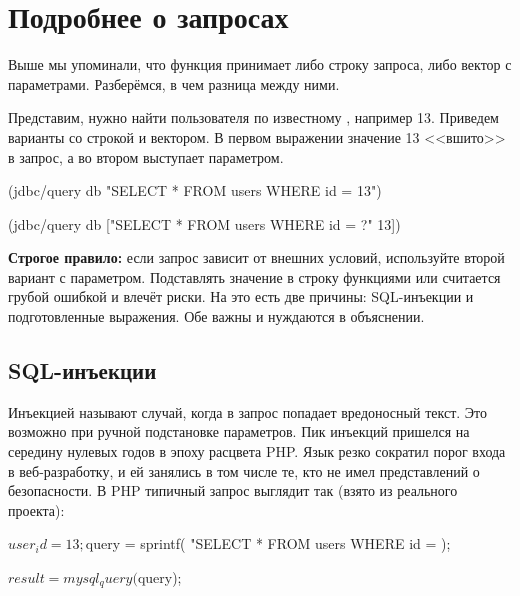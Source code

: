 \section{Подробнее о запросах}

Выше мы упоминали, что функция  принимает либо строку запроса, либо вектор с параметрами. Разберёмся, в чем разница между ними.


Представим, нужно найти пользователя по известному , например 13. Приведем варианты со строкой и вектором. В первом выражении значение 13 <<вшито>> в запрос, а во втором выступает параметром.

\begin{english}
  \begin{clojure}
(jdbc/query db
            "SELECT * FROM users WHERE id = 13")

(jdbc/query db
            ["SELECT * FROM users WHERE id = ?" 13])
  \end{clojure}
\end{english}

\textbf{Строгое правило:} если запрос зависит от внешних условий, используйте второй вариант с параметром. Подставлять значение в строку функциями  или  считается грубой ошибкой и влечёт риски. На это есть две причины: SQL-инъекции и подготовленные выражения. Обе важны и нуждаются в объяснении.

\subsection{SQL-инъекции}


Инъекцией называют случай, когда в запрос попадает вредоносный текст. Это возможно при ручной подстановке параметров. Пик инъекций пришелся на середину нулевых годов в эпоху расцвета PHP. Язык резко сократил порог входа в веб-разработку, и ей занялись в том числе те, кто не имел представлений о безопасности. В PHP типичный запрос выглядит так (взято из реального проекта):


\begin{english}
  \begin{php}
$user_id = 13;

$query = sprintf(
  "SELECT * FROM users WHERE id = %
);

$result = mysql_query($query);
  \end{php}
\end{english}

